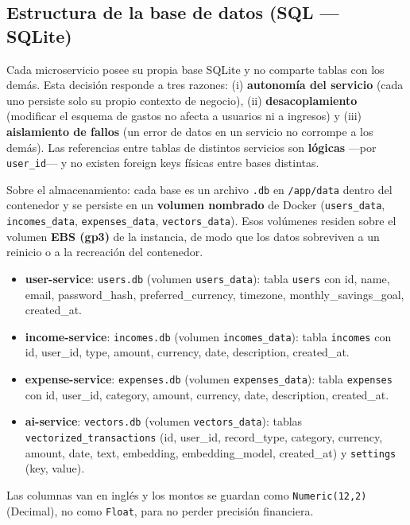 \documentclass[12pt,letterpaper]{article}
\begin{document}
\subsection{Estructura de la base de datos (SQL --- SQLite)}
Cada microservicio posee su propia base SQLite y no comparte tablas con los dem\'as. Esta
decisi\'on responde a tres razones: (i) \textbf{autonom\'ia del servicio} (cada uno persiste
solo su propio contexto de negocio), (ii) \textbf{desacoplamiento} (modificar el esquema de
gastos no afecta a usuarios ni a ingresos) y (iii) \textbf{aislamiento de fallos} (un error de
datos en un servicio no corrompe a los dem\'as). Las referencias entre tablas de distintos
servicios son \textbf{l\'ogicas} ---por \texttt{user\_id}--- y no existen foreign keys f\'isicas
entre bases distintas.

Sobre el almacenamiento: cada base es un archivo \texttt{.db} en \texttt{/app/data} dentro
del contenedor y se persiste en un \textbf{volumen nombrado} de Docker
(\texttt{users\_data}, \texttt{incomes\_data}, \texttt{expenses\_data}, \texttt{vectors\_data}).
Esos vol\'umenes residen sobre el volumen \textbf{EBS (gp3)} de la instancia, de modo que
los datos sobreviven a un reinicio o a la recreaci\'on del contenedor.

\begin{itemize}[leftmargin=1.2cm]
  \item \textbf{user-service}: \texttt{users.db} (volumen \texttt{users\_data}): tabla \texttt{users} con id, name, email, password\_hash, preferred\_currency, timezone, monthly\_savings\_goal, created\_at.
  \item \textbf{income-service}: \texttt{incomes.db} (volumen \texttt{incomes\_data}): tabla \texttt{incomes} con id, user\_id, type, amount, currency, date, description, created\_at.
  \item \textbf{expense-service}: \texttt{expenses.db} (volumen \texttt{expenses\_data}): tabla \texttt{expenses} con id, user\_id, category, amount, currency, date, description, created\_at.
  \item \textbf{ai-service}: \texttt{vectors.db} (volumen \texttt{vectors\_data}): tablas \texttt{vectorized\_transactions} (id, user\_id, record\_type, category, currency, amount, date, text, embedding, embedding\_model, created\_at) y \texttt{settings} (key, value).
\end{itemize}


Las columnas van en ingl\'es y los montos se guardan como \texttt{Numeric(12,2)}
(Decimal), no como \texttt{Float}, para no perder precisi\'on financiera.
\end{document}
